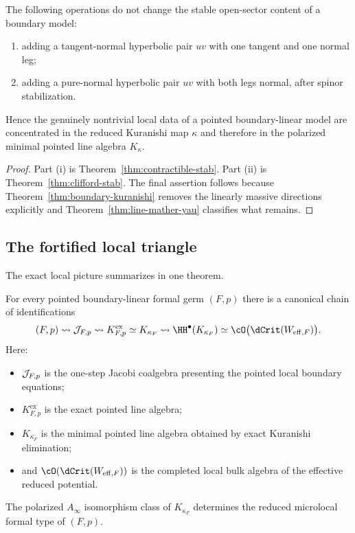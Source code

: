 \begin{corollary}\label{cor:stable-invisibility}
The following operations do not change the stable open-sector content of a boundary model:
\begin{enumerate}[label=(\roman*),leftmargin=1.8em]
\item adding a tangent-normal hyperbolic pair $u v$ with one tangent and one normal leg;
\item adding a pure-normal hyperbolic pair $uv$ with both legs normal, after spinor stabilization.
\end{enumerate}
Hence the genuinely nontrivial local data of a pointed boundary-linear model are concentrated in the reduced Kuranishi map $\kappa$ and therefore in the polarized minimal pointed line algebra $K_\kappa$.
\end{corollary}

\begin{proof}
Part (i) is Theorem~\ref{thm:contractible-stab}. Part (ii) is Theorem~\ref{thm:clifford-stab}. The final assertion follows because Theorem~\ref{thm:boundary-kuranishi} removes the linearly massive directions explicitly and Theorem~\ref{thm:line-mather-yau} classifies what remains.
\end{proof}

\subsection{The fortified local triangle}

The exact local picture summarizes in one theorem.

\begin{theorem}\label{thm:fortified-local-triangle}
For every pointed boundary-linear formal germ $(F,p)$ there is a canonical chain of identifications
\[
(F,p)
\rightsquigarrow
\cJ_{F,p}
\rightsquigarrow
K^{\mathrm{ex}}_{F,p}
\simeq
K_{\kappa_F}
\rightsquigarrow
\HH^\bullet(K_{\kappa_F})
\simeq
\cO\bigl(\dCrit(W_{\eff,F})\bigr).
\]
Here:
\begin{itemize}[leftmargin=1.8em]
\item $\mathcal J_{F,p}$ is the one-step Jacobi coalgebra presenting the pointed local boundary equations;
\item $K^{\mathrm{ex}}_{F,p}$ is the exact pointed line algebra;
\item $K_{\kappa_F}$ is the minimal pointed line algebra obtained by exact Kuranishi elimination;
\item and $\cO(\dCrit(W_{\eff,F}))$ is the completed local bulk algebra of the effective reduced potential.
\end{itemize}
The polarized $A_\infty$ isomorphism class of $K_{\kappa_F}$ determines the reduced microlocal formal type of $(F,p)$.
\end{theorem}

